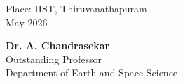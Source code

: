 \begin{dedication}
  \vspace*{1.5in}
  \begin{minipage}{0.95\textwidth}
    \begin{minipage}{0.49\linewidth}
      \begin{flushleft}
        Place: IIST, Thiruvanathapuram\\
        May 2026
      \end{flushleft}
    \end{minipage}
    \hfill
    \begin{minipage}{0.49\linewidth}
      \begin{flushright}
        {\bf Dr. A. Chandrasekar} \\
        Outstanding Professor\\
        Department of Earth and Space Science\\
      \end{flushright}
    \end{minipage}
  \end{minipage}
\end{dedication}
